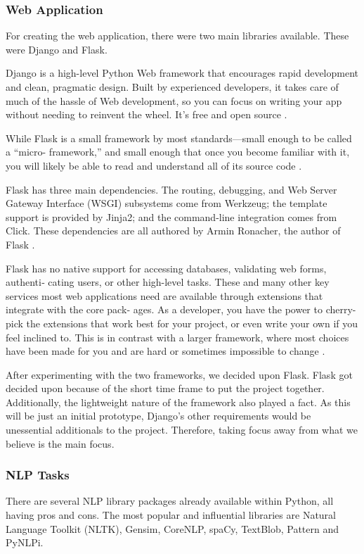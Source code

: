 	\subsubsection{Web Application}
	For creating the web application, there were two main libraries available. These were Django and Flask.
	
	Django is a high-level Python Web framework that encourages rapid development and clean, pragmatic design. Built by experienced developers, it takes care of much of the hassle of Web development, so you can focus on writing your app without needing to reinvent the wheel. It’s free and open source \cite{django}.
	
	While Flask is a small framework by most standards—small enough to be called a “micro- framework,” and small enough that once you become familiar with it, you will likely be able to read and understand all of its source code \cite{grinberg2018flask}. 
	
	Flask has three main dependencies. The routing, debugging, and Web Server Gateway Interface (WSGI) subsystems come from Werkzeug; the template support is provided by Jinja2; and the command-line integration comes from Click. These dependencies are all authored by Armin Ronacher, the author of Flask \cite{grinberg2018flask}. 
	
	Flask has no native support for accessing databases, validating web forms, authenti‐ cating users, or other high-level tasks. These and many other key services most web applications need are available through extensions that integrate with the core pack‐ ages. As a developer, you have the power to cherry-pick the extensions that work best for your project, or even write your own if you feel inclined to. This is in contrast with a larger framework, where most choices have been made for you and are hard or sometimes impossible to change \cite{grinberg2018flask}.
	
	After experimenting with the two frameworks, we decided upon Flask. Flask got decided upon because of the short time frame to put the project together. Additionally, the lightweight nature of the framework also played a fact. As this will be just an initial prototype, Django's other requirements would be unessential additionals to the project. Therefore, taking focus away from what we believe is the main focus. 
	
	\subsubsection{NLP Tasks}
	There are several NLP library packages already available within Python, all having pros and cons. The most popular and influential libraries are Natural Language Toolkit (NLTK), Gensim, CoreNLP, spaCy, TextBlob, Pattern and PyNLPi.
	
